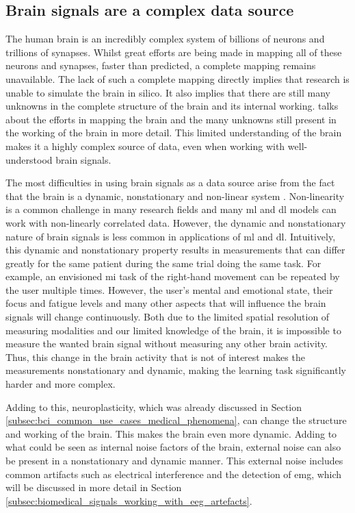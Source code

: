 
\subsection{Brain signals are a complex data source}
\label{subsec:bci_opportunities_obstacles_complex}


The human brain is an incredibly complex system of billions of neurons and trillions of synapses.
Whilst great efforts are being made in mapping all of these neurons and synapses, faster than predicted, a complete mapping remains unavailable.
The lack of such a complete mapping directly implies that research is unable to simulate the brain in silico.
It also implies that there are still many unknowns in the complete structure of the brain and its internal working.
 talks about the efforts in mapping the brain and the many unknowns still present in the working of the brain in more detail.
This limited understanding of the brain makes it a highly complex source of data, even when working with well-understood brain signals.

The most difficulties in using brain signals as a data source arise from the fact that the brain is a dynamic, nonstationary and non-linear system \citep{bci_applications}.
Non-linearity is a common challenge in many research fields and many \gls{ml} and \gls{dl} models can work with non-linearly correlated data.
However, the dynamic and nonstationary nature of brain signals is less common in applications of \gls{ml} and \gls{dl}.
Intuitively, this dynamic and nonstationary property results in measurements that can differ greatly for the same patient during the same trial doing the same task.
For example, an envisioned \gls{mi} task of the right-hand movement can be repeated by the user multiple times.
However, the user's mental and emotional state, their focus and fatigue levels and many other aspects that will influence the brain signals will change continuously.
Both due to the limited spatial resolution of measuring modalities and our limited knowledge of the brain, it is impossible to measure the wanted brain signal without measuring any other brain activity.
Thus, this change in the brain activity that is not of interest makes the measurements nonstationary and dynamic, making the learning task significantly harder and more complex.

Adding to this, neuroplasticity, which was already discussed in Section \ref{subsec:bci_common_use_cases_medical_phenomena}, can change the structure and working of the brain.
This makes the brain even more dynamic.
Adding to what could be seen as internal noise factors of the brain, external noise can also be present in a nonstationary and dynamic manner.
This external noise includes common artifacts such as electrical interference and the detection of \gls{emg}, which will be discussed in more detail in Section \ref{subsec:biomedical_signals_working_with_eeg_artefacts}.

